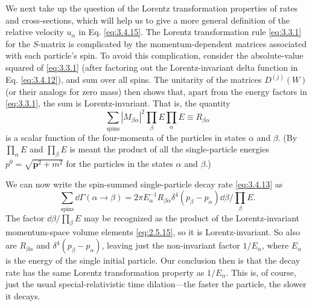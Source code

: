 We next take up the question of the Lorentz transformation properties of rates and cross-sections,
which will help us to give a more general definition of the relative velocity $u_\alpha$ in
Eq. \eqref{eq:3.4.15}. The Lorentz transformation rule \eqref{eq:3.3.1} for the $S$-matrix is complicated by the
momentum-dependent matrices associated with each particle's spin. To avoid this complication,
consider the absolute-value squared of \eqref{eq:3.3.1} (after factoring out the Lorentz-invariant delta
function in Eq. \eqref{eq:3.4.12}), and sum over all spins. The unitarity of the matrices $D^{(j)}(W)$
(or their analogs for zero mass) then shows that, apart from the energy factors in \eqref{eq:3.3.1}, the
sum is Lorentz-invariant. That is, the quantity
\begin{equation}
 \sum_{\mathrm{spins}}|M_{\beta\alpha}|^2\prod_\beta E\prod_\alpha E
 \equiv R_{\beta\alpha}
 \tag{3.4.16}\label{eq:3.4.16}
\end{equation}
is a scalar function of the four-momenta of the particles in states $\alpha$ and $\beta$.
(By $\prod_\alpha E$ and $\prod_\beta E$ is meant the product of all the single-particle energies
$p^0=\sqrt{\mathbf{p}^2+m^2}$ for the particles in the states $\alpha$ and $\beta$.)

We can now write the spin-summed single-particle decay rate \eqref{eq:3.4.13} as
\[
 \sum_{\mathrm{spins}}\dd\Gamma(\alpha\to\beta)
 =2\pi E_\alpha^{-1}R_{\beta\alpha}\delta^4(p_\beta-p_\alpha)\dd\beta
 /\prod_\beta E.
\]
The factor $\dd\beta/\prod_\beta E$ may be recognized as the product of the Lorentz-invariant
momentum-space volume elements \eqref{eq:2.5.15}, so it is Lorentz-invariant. So also are
$R_{\beta\alpha}$ and $\delta^4(p_\beta-p_\alpha)$, leaving just the non-invariant factor
$1/E_\alpha$, where $E_\alpha$ is the energy of the single initial particle. Our conclusion
then is that the decay rate has the same Lorentz transformation property as $1/E_\alpha$.
This is, of course, just the usual special-relativistic time dilation---the faster the particle,
the slower it decays.

